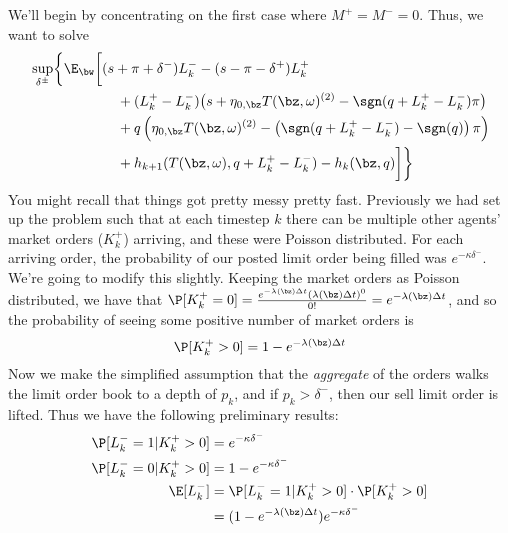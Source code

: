 \documentclass[12pt]{article}
\begin{document}
We'll begin by concentrating on the first case where $M^+ = M^- = 0$. Thus, we want to solve
\begin{equation}
\label{eq:discretesup1}
\begin{split}
& \sup_{\delta^\pm} \biggl\lbrace \E_{\bw} \biggl[
(s + \pi + \delta^-)L_k^- - (s - \pi - \delta^+)L_k^+ \\
& \hphantom{\sup_{\bu} \biggl\lbrace \E_{\bw} \biggl[ {}+{}} + (L_k^+ - L_k^-) \bigl( s + \eta_{0,\bz} T(\bz, \omega)^{(2)}  -\sgn( q + L_k^+ - L_k^-)\pi   \bigr) \\
& \hphantom{\sup_{\bu} \biggl\lbrace \E_{\bw} \biggl[ {}+{}} + q\left( \eta_{0,\bz} T(\bz, \omega)^{(2)}  -\left( \sgn( q + L_k^+ - L_k^-) - \sgn(q) \right) \pi \right) \\
& \hphantom{\sup_{\bu} \biggl\lbrace \E_{\bw} \biggl[ {}+{}} + h_{k+1}(T(\bz,\omega), q + L_k^+ - L_k^- ) -  h_k(\bz,q) \biggr] \biggr\rbrace
\end{split}
\end{equation}
You might recall that things got pretty messy pretty fast. Previously we had set up the problem such that at each timestep $k$ there can be multiple other agents' market orders ($K_k^+$) arriving, and these were Poisson distributed. For each arriving order, the probability of our posted limit order being filled was $e^{-\kappa \delta^-}$. We're going to modify this slightly. Keeping the market orders as Poisson distributed, we have that $\P [ K_k^+ = 0] = \frac{e^{-\lambda (\bz) \Delta t} (\lambda (\bz) \Delta t)^0}{0!} = e^{-\lambda (\bz) \Delta t}$, and so the probability of seeing some positive number of market orders is
\begin{equation}
\label{eq:discretepositiveKplus}
\P [ K_k^+ > 0] = 1 - e^{-\lambda (\bz) \Delta t}
\end{equation}
Now we make the simplified assumption that the \textit{aggregate} of the orders walks the limit order book to a depth of $p_k$, and if $p_k > \delta^-$, then our sell limit order is lifted. Thus we have the following preliminary results:
\begin{align*}
\P [ L_k^- = 1 | K_k^+ > 0] & = e^{-\kappa \delta^-} \\
\P [ L_k^- = 0 | K_k^+ > 0] & = 1 - e^{-\kappa \delta^-} \\
\E [ L_k^- ] & = \P [ L_k^- = 1 | K_k^+ > 0] \cdot \P[K_k^+ > 0] \\
& = ( 1 - e^{-\lambda (\bz) \Delta t} ) e^{-\kappa \delta^-} \\
\end{align*}
\end{document}
